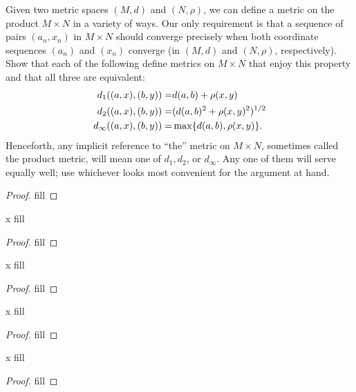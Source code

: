 \begin{exercise}{46}
Given two metric spaces $(M,d)$ and $(N,\rho)$, we can define a metric on the product $M\times N$ in a variety of ways. Our only requirement is that a sequence of pairs $(a_n,x_n)$ in $M\times N$ should converge precisely when both coordinate sequences $(a_n)$ and $(x_n)$ converge (in $(M,d)$ and $(N,\rho)$, respectively). Show that each of the following define metrics on $M\times N$ that enjoy this property and that all three are equivalent:
\begin{align*}
    d_1((a,x),(b,y)) =& d(a,b)+\rho(x,y)\\
    d_2((a,x),(b,y)) =& (d(a,b)^2+\rho(x,y)^2)^{1/2}\\
    d_\infty((a,x),(b,y)) =& \max\{d(a,b),\rho(x,y)\}.
\end{align*}
Henceforth, any implicit reference to ``the'' metric on $M\times N$, sometimes called the product metric, will mean one of $d_1,d_2$, or $d_\infty$. Any one of them will serve equally well; use whichever looks most convenient for the argument at hand.
\end{exercise}
\begin{proof}
fill
\end{proof} 



\begin{exercise}{x}
fill
\end{exercise}
\begin{proof}
fill
\end{proof} 

\begin{exercise}{x}
fill
\end{exercise}
\begin{proof}
fill
\end{proof} 

\begin{exercise}{x}
fill
\end{exercise}
\begin{proof}
fill
\end{proof} 

\begin{exercise}{x}
fill
\end{exercise}
\begin{proof}
fill
\end{proof} 